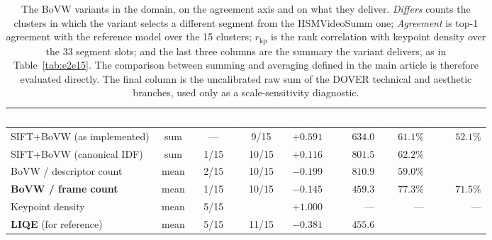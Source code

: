 \documentclass[sn-basic,Numbered]{sn-jnl}
\newcommand{\pfA}[1]{\cellcolor{perf5}\textcolor{white}{\textbf{#1}}}
\newcommand{\pfB}[1]{\cellcolor{perf4}#1}
\newcommand{\pfC}[1]{\cellcolor{perf3}#1}
\newcommand{\pfD}[1]{\cellcolor{perf2}#1}
\newcommand{\pfE}[1]{\cellcolor{perf1}\textcolor{white}{#1}}
\newcommand{\hd}[1]{\textcolor{white}{\textbf{#1}}}
\begin{document}
\begin{table}[!ht]
\centering
\caption{The BoVW variants in the domain, on the agreement axis and on what they
deliver. \emph{Differs} counts the clusters in which the variant selects a
different segment from the HSMVideoSumm one; \emph{Agreement} is top-1 agreement with
the reference model over the 15 clusters; $r_{\mathrm{kp}}$ is the rank
correlation with keypoint density over the 33 segment slots; and the last three
columns are the summary the variant delivers, as in Table~\ref{tab:e2e15}. The
comparison between summing and averaging defined in the main article is
therefore evaluated directly. The final column is the uncalibrated raw sum of
the DOVER technical and aesthetic branches, used only as a scale-sensitivity
diagnostic.}
\label{tab:variants}
\footnotesize
\setlength{\tabcolsep}{3.5pt}
\renewcommand{\arraystretch}{1.14}
\begin{tabular}{@{}l c c c r r r r@{}}
\toprule
\rowcolor{headerblue}
\hd{Variant} & \hd{Aggr.} & \hd{Differs} & \hd{Agreem.} &
\hd{$r_{\mathrm{kp}}$} & \hd{Dur.\ (s)} & \hd{Q-Align} & \hd{raw T+A} \\
\midrule
\rowcolor{focoauditado!12} SIFT+BoVW (as implemented) & sum & --- & \pfD{9/15} & $+0.591$ & $634.0$ & \pfC{$61.1\%$} & \pfD{$52.1\%$} \\
\rowcolor{rowwhite} SIFT+BoVW (canonical IDF)  & sum & 1/15 & \pfC{10/15} & $+0.116$ & $801.5$ & \pfC{$62.2\%$} & \pfE{$47.6\%$} \\
\rowcolor{rowlight} BoVW / descriptor count    & mean & 2/15 & \pfC{10/15} & $-0.199$ & $810.9$ & \pfC{$59.0\%$} & \pfE{$48.2\%$} \\
\rowcolor{perf4!22} \textbf{BoVW / frame count} & mean & 1/15 & \pfC{10/15} & $-0.145$ & $\mathbf{459.3}$ & \pfB{$\mathbf{77.3\%}$} & \pfB{$\mathbf{71.5\%}$} \\
\midrule
\rowcolor{rowlight} Keypoint density           & mean & 5/15 & \pfE{\ \,7/15} & $+1.000$ & --- & --- & --- \\
\rowcolor{perf5!16} \textbf{LIQE} (for reference) & mean & 5/15 & \pfB{11/15} & $-0.381$ & $455.6$ & \pfA{$85.8\%$} & \pfA{$91.8\%$} \\
\bottomrule
\end{tabular}
\end{table}
\end{document}
